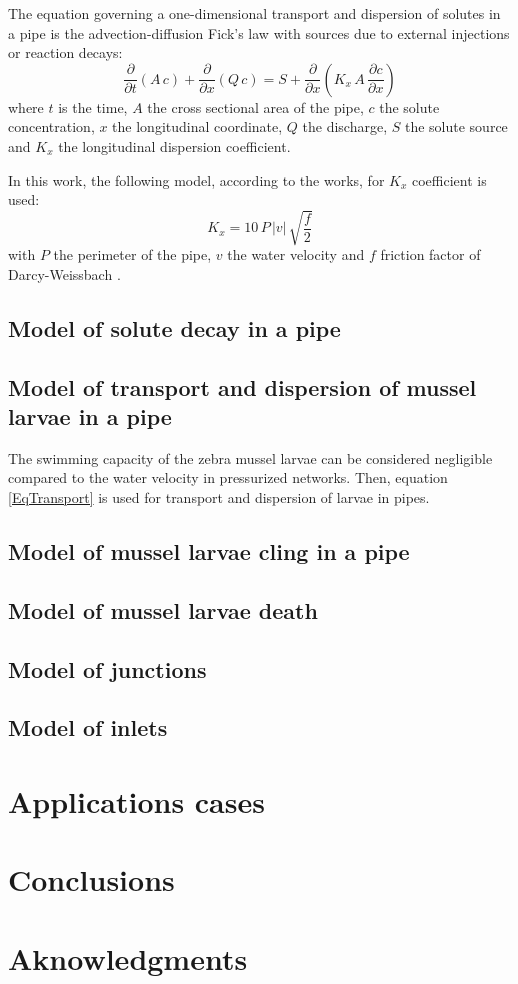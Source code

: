 \documentclass[review,authoryear]{elsarticle}
\newcommand{\EQ}[2]{\begin{equation}#1\label{#2}\end{equation}}
\newcommand{\PA}[1]{\left(#1\right)}
\newcommand{\PARTIAL}[2]{\frac{\partial#1}{\partial#2}}
\begin{document}
The equation governing a one-dimensional transport and dispersion of solutes in
a pipe is the advection-diffusion Fick's law with sources due to external
injections or reaction decays:
\EQ{\PARTIAL{}{t}(A\,c)+\PARTIAL{}{x}(Q\,c)
	=S+\PARTIAL{}{x}\PA{K_x\,A\,\PARTIAL{c}{x}}}{EqTransport}
where $t$ is the time, $A$ the cross sectional area of the pipe, $c$ the solute
concentration, $x$ the longitudinal coordinate, $Q$ the discharge, $S$ the
solute source and $K_x$ the longitudinal dispersion coefficient.

In this work, the following model, according to the \citet{Rutherford94} works,
for $K_x$ coefficient is used:
\EQ{K_x=10\,P\,|v|\,\sqrt{\frac{f}{2}}}{EqKx}  
with $P$ the perimeter of the pipe, $v$ the water velocity and $f$ friction
factor of Darcy-Weissbach \citep{Darcy58}.

\subsection{Model of solute decay in a pipe}

\subsection{Model of transport and dispersion of mussel larvae in a pipe}

The swimming capacity of the zebra mussel larvae can be considered negligible
compared to the water velocity in pressurized networks. Then, equation
\ref{EqTransport} is used for transport and dispersion of larvae in pipes.

\subsection{Model of mussel larvae cling in a pipe}

\subsection{Model of mussel larvae death}

\subsection{Model of junctions}

\subsection{Model of inlets}

\section{Applications cases}

\section{Conclusions}

\section*{Aknowledgments}



\end{document}
